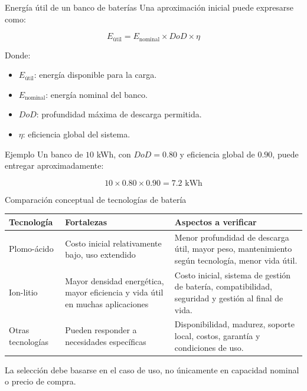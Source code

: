 \documentclass[aspectratio=169,10pt]{beamer}
\begin{document}
\begin{frame}{Energía útil de un banco de baterías}
Una aproximación inicial puede expresarse como:

\[
E_{\text{útil}} = E_{\text{nominal}} \times DoD \times \eta
\]

Donde:

\begin{itemize}
    \item \(E_{\text{útil}}\): energía disponible para la carga.
    \item \(E_{\text{nominal}}\): energía nominal del banco.
    \item \(DoD\): profundidad máxima de descarga permitida.
    \item \(\eta\): eficiencia global del sistema.
\end{itemize}

\begin{exampleblock}{Ejemplo}
Un banco de \(10\) kWh, con \(DoD = 0.80\) y eficiencia global de \(0.90\), puede entregar aproximadamente:

\[
10 \times 0.80 \times 0.90 = 7.2 \text{ kWh}
\]
\end{exampleblock}
\end{frame}

\begin{frame}{Comparación conceptual de tecnologías de batería}
\begin{table}
\centering
\small
\begin{tabular}{p{} p{} p{}}
\toprule
\textbf{Tecnología} & \textbf{Fortalezas} & \textbf{Aspectos a verificar} \\
\midrule
Plomo-ácido & Costo inicial relativamente bajo, uso extendido & Menor profundidad de descarga útil, mayor peso, mantenimiento según tecnología, menor vida útil. \\
\addlinespace
Ion-litio & Mayor densidad energética, mayor eficiencia y vida útil en muchas aplicaciones & Costo inicial, sistema de gestión de batería, compatibilidad, seguridad y gestión al final de vida. \\
\addlinespace
Otras tecnologías & Pueden responder a necesidades específicas & Disponibilidad, madurez, soporte local, costos, garantía y condiciones de uso. \\
\bottomrule
\end{tabular}
\end{table}

\alert{La selección debe basarse en el caso de uso, no únicamente en capacidad nominal o precio de compra.}
\end{frame}
\end{document}
